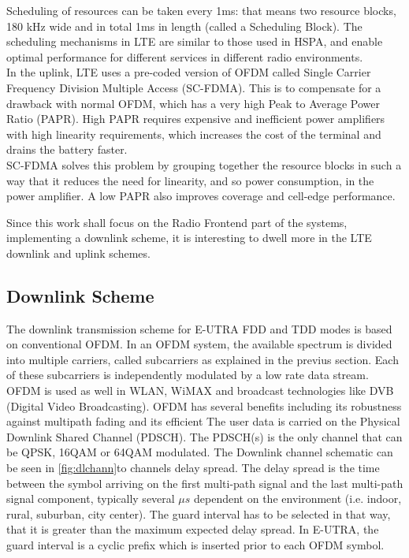 Scheduling of resources can be taken every 1ms: that means two resource blocks,
180 kHz wide and in total 1ms in length (called a Scheduling Block). The scheduling
mechanisms in LTE are similar to those used in HSPA, and enable optimal performance
for different services in different radio environments.\\

In the uplink, LTE uses a pre-coded version of OFDM called Single Carrier Frequency
Division Multiple Access (SC-FDMA). This is to compensate for a drawback with normal
OFDM, which has a very high Peak to Average Power Ratio (PAPR). High PAPR requires
expensive and inefficient power amplifiers with high linearity requirements, which
increases the cost of the terminal and drains the battery faster.\\

SC-FDMA solves this problem by grouping together the resource blocks in such a
way that it reduces the need for linearity, and so power consumption, in the
power amplifier. A low PAPR also improves coverage and cell-edge performance.

Since this work shall focus on the Radio Frontend part of the systems, implementing
a downlink scheme, it is interesting to dwell more in the LTE downlink and uplink
schemes.

\subsection{Downlink Scheme}%

The downlink transmission scheme for E-UTRA FDD and TDD modes is based on
conventional OFDM. In an OFDM system, the available spectrum is divided into
multiple carriers, called subcarriers as explained in the previus section. Each
of these subcarriers is independently modulated by a low rate data stream. OFDM
is used as well in WLAN, WiMAX and broadcast technologies like DVB (Digital
Video Broadcasting). OFDM has several benefits including its robustness against
multipath fading and its efficient The user data is carried on the Physical Downlink Shared Channel (PDSCH). The
PDSCH(s) is the only channel that can be QPSK, 16QAM or 64QAM modulated. The
Downlink channel schematic can be seen in \ref{fig:dlchann}to channels delay spread. The delay spread is
the time between the symbol arriving on the first multi-path signal and the last
multi-path signal component, typically several $\mu s$ dependent on the environment
(i.e. indoor, rural, suburban, city center). The guard interval has to be selected
in that way, that it is greater than the maximum expected delay spread. In E-UTRA,
the guard interval is a cyclic prefix which is inserted prior to each OFDM symbol.\\

